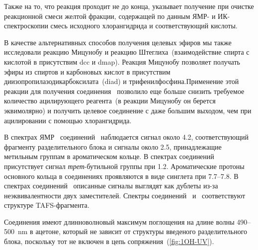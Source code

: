 Также на то, что реакция проходит не до конца, указывает получение при очистке реакционной смеси желтой фракции, содержащей по данным ЯМР- и ИК-спектроскопии смесь исходного хлорангидрида и соответствующий кислоты.

В качестве альтернативных способов получения целевых эфиров мы также исследовали реакцию Мицунобу и реакцию Штеглиха~(взаимодействие спирта с кислотой в присутствим \ac{dcc} и \ac{dmap}).
Реакция Мицунобу позволяет получать эфиры из спиртов и карбоновых кислот в присутствим диизопропилазодикарбоксилата~(\ac{diad}) и трифенилфосфина.Применение этой реакции для получения соединения~ позволило еще больше снизить требуемое количество ацилирующего реагента~(в реакции Мицунобу он берется эквимолярно) и получить целевое соединение с даже большим выходом, чем при ацилировании с помощью хлорангидрида.


В спектрах ЯМР~ соединений~ наблюдается сигнал около \SI{4.2}{\ppm}, соответствующий  фрагменту разделительного блока и сигналы около \SI{2.5}{\ppm}, принадлежащие метильным группам в ароматическом кольце.
В спектрах соединений~ присутствует сигнал \emph{трет}-бутильной группы при \SI{1.2}{\ppm}. Ароматические протоны основного  кольца в соединениях  проявляются в виде синглета при 7.7--\SI{7.8}{\ppm}.
В спектрах соединений~ описанные сигналы выглядят как дублеты из-за неэквивалентности двух заместителей.
Спектры  соединений~ и~ соответствуют структуре TAFS-фрагмента.

Соединения имеют длинноволновый максимум поглощения на длине волны 490--\SI{500}{\nano\metre} в ацетоне, который не зависит от структуры введеного разделительного блока, поскольку тот не включен в цепь сопряжения~(\ref{fig:1OH-UV}).

